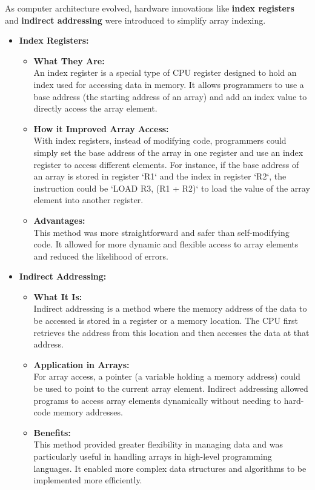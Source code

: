 \documentclass{book}
\begin{document}
		As computer architecture evolved, hardware innovations like \textbf{index registers} and  \textbf{indirect addressing} were introduced to simplify array indexing.
		\begin{itemize}
			\item \textbf{Index Registers:}
				\begin{itemize}
				 	\item \textbf{What They Are:} \\
				 			An index register is a special type of CPU register designed to hold an index used for 		accessing data in memory. It allows programmers to use a base address (the starting address of an array) and add an index value to directly access the array element.
					 \item  \textbf{How it Improved Array Access:}\\
				 			With index registers, instead of modifying code, programmers could simply set the base address of the array in one register and use an index register to access different elements. For instance, if the base address of an array is stored in register `R1` and the index in register `R2`, the instruction could be `LOAD R3, (R1 + R2)` to load the value of the array element into another register.
					  \item  \textbf{Advantages:}\\
				  			This method was more straightforward and safer than self-modifying code. It allowed for more dynamic and flexible access to array elements and reduced the likelihood of errors.
				\end{itemize}
			 \item \textbf{Indirect Addressing:}
	\begin{itemize}
			\item \textbf{What It Is:} \\
				Indirect addressing is a method where the memory address of the data to be accessed is stored in a register or a memory location. The CPU first retrieves the address from this location and then accesses the data at that address.
				
			\item \textbf{Application in Arrays:} \\
				For array access, a pointer (a variable holding a memory address) could be used to point to the current array element. Indirect addressing allowed programs to access array elements dynamically without needing to hard-code memory addresses.
				
			\item \textbf{Benefits:} \\
				This method provided greater flexibility in managing data and was particularly useful in handling arrays in high-level programming languages. It enabled more complex data structures and algorithms to be implemented more efficiently.
			\end{itemize}
	 \end{itemize}
\end{document}
